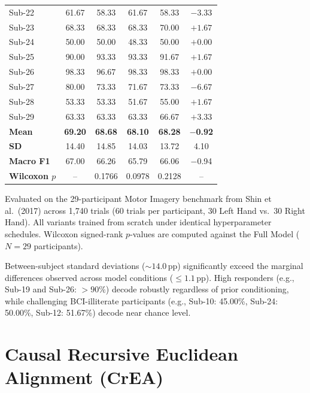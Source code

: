\documentclass[journal]{IEEEtran}
\begin{document}
\begin{table}[!htbp]
{\begin{tabular}{@{}lccccc@{}}
Sub-22 & 61.67 & 58.33 & 61.67 & 58.33 & $-3.33$ \\
Sub-23 & 68.33 & 68.33 & 68.33 & 70.00 & $+1.67$ \\
Sub-24 & 50.00 & 50.00 & 48.33 & 50.00 & $+0.00$ \\
Sub-25 & 90.00 & 93.33 & 93.33 & 91.67 & $+1.67$ \\
Sub-26 & 98.33 & 96.67 & 98.33 & 98.33 & $+0.00$ \\
Sub-27 & 80.00 & 73.33 & 71.67 & 73.33 & $-6.67$ \\
Sub-28 & 53.33 & 53.33 & 51.67 & 55.00 & $+1.67$ \\
Sub-29 & 63.33 & 63.33 & 63.33 & 66.67 & $+3.33$ \\
\midrule
\textbf{Mean} & \textbf{69.20} & \textbf{68.68} & \textbf{68.10} & \textbf{68.28} & \textbf{$-$0.92} \\
\textbf{SD} & 14.40 & 14.85 & 14.03 & 13.72 & 4.10 \\
\textbf{Macro F1} & 67.00 & 66.26 & 65.79 & 66.06 & $-$0.94 \\
\textbf{Wilcoxon $p$} & -- & 0.1766 & 0.0978 & 0.2128 & -- \\
\bottomrule
\end{tabular}%
}
\par\smallskip
{\scriptsize Evaluated on the 29-participant Motor Imagery benchmark from Shin et al.\ (2017) \cite{shin2017open} across 1,740 trials (60 trials per participant, 30 Left Hand vs.\ 30 Right Hand). All variants trained from scratch under identical hyperparameter schedules. Wilcoxon signed-rank $p$-values are computed against the Full Model ($N=29$ participants).}
\end{table}

Between-subject standard deviations ($\sim 14.0$\,pp) significantly exceed the marginal differences observed across model conditions ($\le 1.1$\,pp). High responders (e.g., Sub-19 and Sub-26: $>90\%$) decode robustly regardless of prior conditioning, while challenging BCI-illiterate participants (e.g., Sub-10: 45.00\%, Sub-24: 50.00\%, Sub-12: 51.67\%) decode near chance level.

\section{Causal Recursive Euclidean Alignment (CrEA)}
\label{sec:supp_crea}
\end{document}
